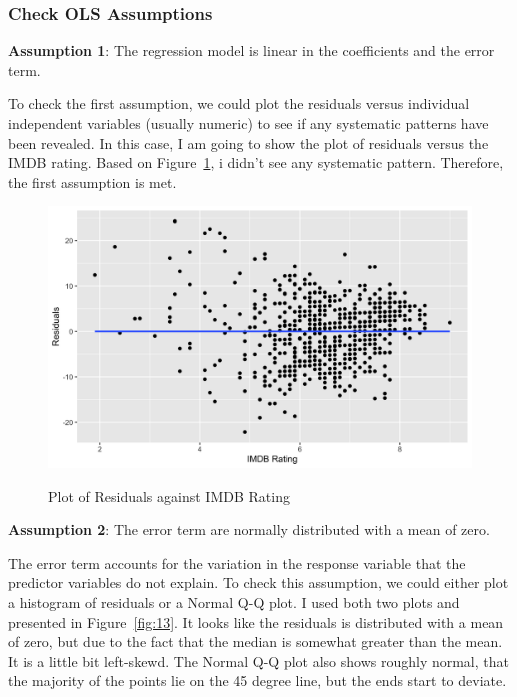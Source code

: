 \documentclass{article}
\begin{document}
\subsubsection{Check OLS Assumptions}
\textbf{Assumption 1}: The regression model is linear in the coefficients and the error term.

To check the first assumption, we could plot the residuals versus individual independent variables (usually numeric) to see if any systematic patterns have been revealed. In this case, I am going to show the plot of residuals versus the IMDB rating. Based on Figure~\ref{fig:12}, i didn't see any systematic pattern. Therefore, the first assumption is met.

\begin{figure}[htbp]
\begin{center}
\caption{Plot of Residuals against IMDB Rating}
\includegraphics[scale=0.3]{linearity.png}
\label{fig:12}
\end{center}
\end{figure}

\textbf{Assumption 2}:  The error term are normally distributed with a mean of zero.

The error term accounts for the variation in the response variable that the predictor variables do not explain. To check this assumption, we could either plot a histogram of residuals or a Normal Q-Q plot. I used both two plots and presented in Figure~\ref{fig:13}. It looks like the residuals is distributed with a mean of zero, but due to the fact that the median is somewhat greater than the mean. It is a little bit left-skewd. The Normal Q-Q plot also shows roughly normal, that the majority of the points lie on the 45 degree line, but the ends start to deviate.
\end{document}
